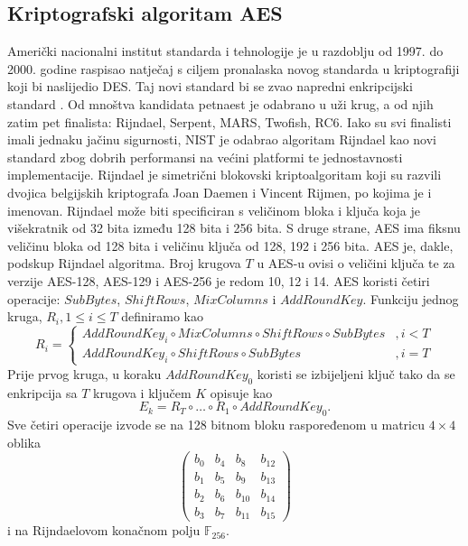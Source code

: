 \documentclass[times, utf8, diplomski]{fer}
\begin{document}
\subsection{Kriptografski algoritam AES}
Američki nacionalni institut standarda i tehnologije  je u razdoblju od 1997. do 2000. godine raspisao natječaj s ciljem pronalaska novog standarda u kriptografiji koji bi naslijedio DES. Taj novi standard bi se zvao napredni enkripcijski standard . Od mnoštva kandidata petnaest je odabrano u uži krug, a od njih zatim pet finalista: Rijndael, Serpent, MARS, Twofish, RC6. Iako su svi finalisti imali jednaku jačinu sigurnosti, NIST je odabrao algoritam Rijndael kao novi standard zbog dobrih performansi na većini platformi te jednostavnosti implementacije. Rijndael je simetrični blokovski kriptoalgoritam koji su razvili dvojica belgijskih kriptografa Joan Daemen i Vincent Rijmen, po kojima je i imenovan. Rijndael može biti specificiran s veličinom bloka i ključa koja je višekratnik od 32 bita između 128 bita i 256 bita. S druge strane, AES ima fiksnu veličinu bloka od 128 bita i veličinu ključa od 128, 192 i 256 bita. AES je, dakle, podskup Rijndael algoritma. Broj krugova $T$ u AES-u ovisi o veličini ključa te za verzije AES-128, AES-129 i AES-256 je redom 10, 12 i 14. AES koristi četiri operacije: $SubBytes$, $ShiftRows$, $MixColumns$ i $AddRoundKey$. Funkciju jednog kruga, $R_i, 1 \le i \le T$ definiramo kao
\begin{equation}
    R_i =
    \begin{cases}
        AddRoundKey_i \circ MixColumns \circ ShiftRows \circ SubBytes & , i < T \\
        AddRoundKey_i \circ ShiftRows \circ SubBytes                  & , i = T
    \end{cases}
\end{equation}
Prije prvog kruga, u koraku $AddRoundKey_0$ koristi se izbijeljeni ključ tako da se enkripcija sa $T$ krugova i ključem $K$ opisuje kao
\begin{equation}
    E_k = R_T \circ \dots \circ R_1 \circ AddRoundKey_0.
\end{equation}
Sve četiri operacije izvode se na 128 bitnom bloku raspoređenom u matricu $4 \times 4$ oblika
\[
    \begin{pmatrix}
        b_{0} & b_{4} & b_{8}  & b_{12} \\
        b_{1} & b_{5} & b_{9}  & b_{13} \\
        b_{2} & b_{6} & b_{10} & b_{14} \\
        b_{3} & b_{7} & b_{11} & b_{15}
    \end{pmatrix}
\]
i na Rijndaelovom konačnom polju $\mathbb{F}_{256}$.
\end{document}
